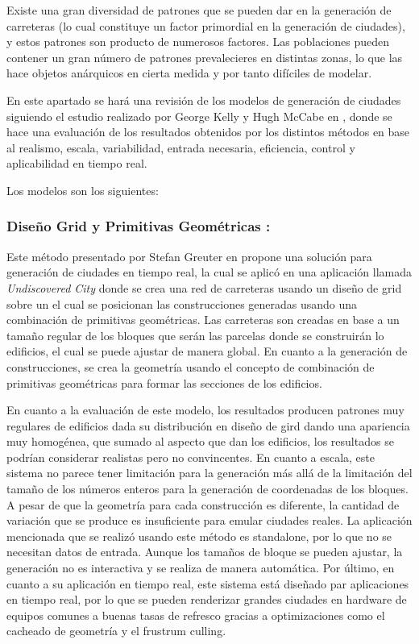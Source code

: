         Existe una gran diversidad de patrones que se pueden dar en la generación de carreteras (lo cual constituye un factor primordial en la generación de ciudades), y estos patrones son producto de numerosos factores. Las poblaciones pueden contener un gran número de patrones prevalecieres en distintas zonas, lo que las hace objetos anárquicos en cierta medida y por tanto difíciles de modelar. 

        En este apartado se hará una revisión de los modelos de generación de ciudades siguiendo el estudio realizado por George Kelly y Hugh McCabe en \cite{kelly2006survey}, donde se hace una evaluación de los resultados obtenidos por los distintos métodos en base al realismo, escala, variabilidad, entrada necesaria, eficiencia, control y aplicabilidad en tiempo real.

        Los modelos son los siguientes:

        \subsubsection{Diseño Grid y Primitivas Geométricas :} Este método presentado por Stefan Greuter en \cite{Greuter2002}\cite{Greuter2003} propone una solución para generación de ciudades en tiempo real, la cual se aplicó en una aplicación llamada \textit{Undiscovered City} donde se crea una red de carreteras usando un diseño de grid sobre un el cual se posicionan las construcciones generadas usando una combinación de primitivas geométricas. Las carreteras son creadas en base a un tamaño regular de los bloques que serán las parcelas donde se construirán lo edificios, el cual se puede ajustar de manera global. En cuanto a la generación de construcciones, se crea la geometría usando el concepto de combinación de primitivas geométricas para formar las secciones de los edificios.
        
            En cuanto a la evaluación de este modelo, los resultados producen patrones muy regulares de edificios dada su distribución en diseño de gird dando una apariencia muy homogénea, que sumado al aspecto que dan los edificios, los resultados se podrían considerar realistas pero no convincentes. En cuanto a escala, este sistema no parece tener limitación para la generación más allá de la limitación del tamaño de los números enteros para la generación de coordenadas de los bloques. A pesar de que la geometría para cada construcción es diferente, la cantidad de variación que se produce es insuficiente para emular ciudades reales. La aplicación mencionada que se realizó usando este método es standalone, por lo que no se necesitan datos de entrada. Aunque los tamaños de bloque se pueden ajustar, la generación no es interactiva y se realiza de manera automática. Por último, en cuanto a su aplicación en tiempo real, este sistema está diseñado par aplicaciones en tiempo real, por lo que se pueden renderizar grandes ciudades en hardware de equipos comunes a buenas tasas de refresco gracias a optimizaciones como el cacheado de geometría y el frustrum culling.
        
